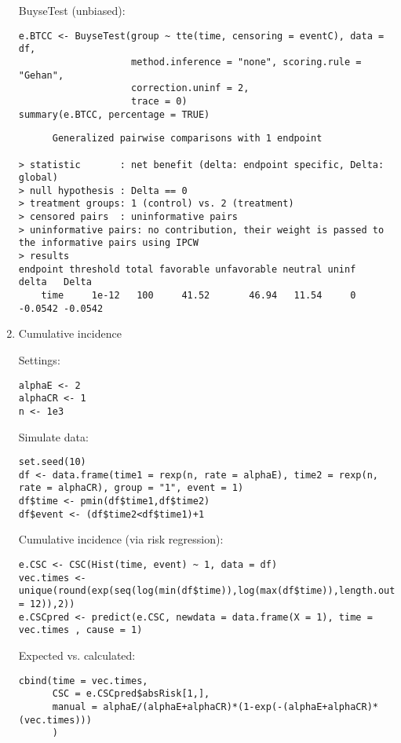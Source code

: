 \documentclass[12pt]{article}
\begin{document}
\begin{enumerate}
BuyseTest (unbiased):
\lstset{language=r,label= ,caption= ,captionpos=b,numbers=none}
\begin{lstlisting}
e.BTCC <- BuyseTest(group ~ tte(time, censoring = eventC), data = df,
					method.inference = "none", scoring.rule = "Gehan",
					correction.uninf = 2,
					trace = 0)
summary(e.BTCC, percentage = TRUE)
\end{lstlisting}

\begin{verbatim}
      Generalized pairwise comparisons with 1 endpoint

> statistic       : net benefit (delta: endpoint specific, Delta: global) 
> null hypothesis : Delta == 0 
> treatment groups: 1 (control) vs. 2 (treatment) 
> censored pairs  : uninformative pairs
> uninformative pairs: no contribution, their weight is passed to the informative pairs using IPCW
> results
endpoint threshold total favorable unfavorable neutral uninf   delta   Delta
    time     1e-12   100     41.52       46.94   11.54     0 -0.0542 -0.0542
\end{verbatim}

\item Cumulative incidence
\label{sec:org0f869a2}

Settings:
\lstset{language=r,label= ,caption= ,captionpos=b,numbers=none}
\begin{lstlisting}
alphaE <- 2
alphaCR <- 1
n <- 1e3
\end{lstlisting}

Simulate data:
\lstset{language=r,label= ,caption= ,captionpos=b,numbers=none}
\begin{lstlisting}
set.seed(10)
df <- data.frame(time1 = rexp(n, rate = alphaE), time2 = rexp(n, rate = alphaCR), group = "1", event = 1)
df$time <- pmin(df$time1,df$time2)
df$event <- (df$time2<df$time1)+1
\end{lstlisting}

Cumulative incidence (via risk regression):
\lstset{language=r,label= ,caption= ,captionpos=b,numbers=none}
\begin{lstlisting}
e.CSC <- CSC(Hist(time, event) ~ 1, data = df)
vec.times <- unique(round(exp(seq(log(min(df$time)),log(max(df$time)),length.out = 12)),2))
e.CSCpred <- predict(e.CSC, newdata = data.frame(X = 1), time = vec.times , cause = 1)
\end{lstlisting}

Expected vs. calculated:
\lstset{language=r,label= ,caption= ,captionpos=b,numbers=none}
\begin{lstlisting}
cbind(time = vec.times,
	  CSC = e.CSCpred$absRisk[1,],
	  manual = alphaE/(alphaE+alphaCR)*(1-exp(-(alphaE+alphaCR)*(vec.times)))
	  )
\end{lstlisting}


\end{enumerate}
\end{document}
